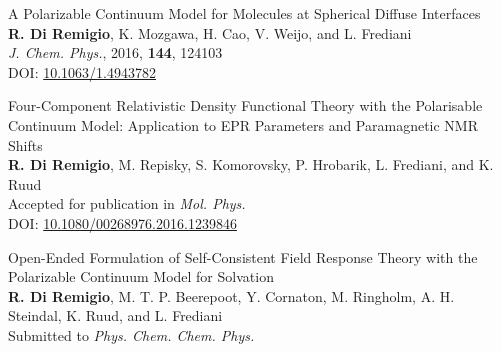 {\Large
\noindent\textsf{A Polarizable Continuum Model for Molecules at Spherical
Diffuse Interfaces
}
\medskip
\\
    \textbf{R. Di Remigio}, K. Mozgawa, H. Cao, V. Weijo, and L.
    Frediani
\medskip
\\
    \textit{J. Chem. Phys.}, \textrm{2016}, \textbf{144}, 124103
\medskip
  \\
  DOI: \url{10.1063/1.4943782}
}
\vspace*{\fill}



\thispagestyle{empty}
\vspace*{\fill}
\begin{flushright}
{\Huge{}}
\end{flushright}

{\Large
\noindent\textsf{Four-Component Relativistic Density Functional Theory with the
Polarisable Continuum Model: Application to EPR Parameters
and Paramagnetic NMR Shifts
}
\medskip
\\
  \textbf{R. Di Remigio}, M. Repisky, S. Komorovsky, P. Hrobarik, L.
  Frediani, and K. Ruud
\medskip
\\
  Accepted for publication in \textit{Mol. Phys.}
\medskip
  \\
  DOI: \url{10.1080/00268976.2016.1239846}
}
\vspace*{\fill}



\thispagestyle{empty}
\vspace*{\fill}
\begin{flushright}
{\Huge{}}
\end{flushright}

{\Large
\noindent\textsf{Open-Ended Formulation of Self-Consistent Field Response Theory with
the Polarizable Continuum Model for Solvation
}
\medskip
\\
    \textbf{R. Di Remigio}, M. T. P. Beerepoot, Y. Cornaton, M. Ringholm,
    A. H. Steindal, K. Ruud, and L. Frediani
\medskip
\\
    Submitted to \textit{Phys. Chem. Chem. Phys.}
}
\vspace*{\fill}


